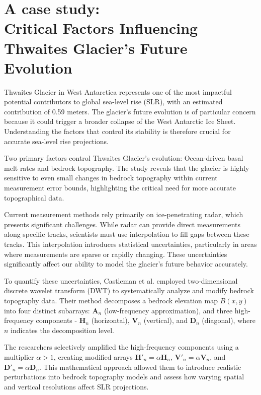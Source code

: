 \section*{A case study:\\Critical Factors Influencing Thwaites Glacier's Future Evolution} %

Thwaites Glacier in West Antarctica represents one of the most impactful potential contributors to global sea-level rise (SLR), with an estimated contribution of 0.59 meters. The glacier's future evolution is of particular concern because it could trigger a broader collapse of the West Antarctic Ice Sheet. Understanding the factors that control its stability is therefore crucial for accurate sea-level rise projections.

Two primary factors control Thwaites Glacier's evolution\cite{Castleman_2022}: Ocean-driven basal melt rates and bedrock topography. The study reveals that the glacier is highly sensitive to even small changes in bedrock topography within current measurement error bounds, highlighting the critical need for more accurate topographical data.

Current measurement methods rely primarily on ice-penetrating radar, which presents significant challenges. While radar can provide direct measurements along specific tracks, scientists must use interpolation to fill gaps between these tracks. This interpolation introduces statistical uncertainties, particularly in areas where measurements are sparse or rapidly changing. These uncertainties significantly affect our ability to model the glacier's future behavior accurately.

To quantify these uncertainties, Castleman et al.\cite{Castleman_2022} employed two-dimensional discrete wavelet transform (DWT) to systematically analyze and modify bedrock topography data. Their method decomposes a bedrock elevation map $B(x,y)$ into four distinct subarrays: $\mathbf{A}_n$ (low-frequency approximation), and three high-frequency components - $\mathbf{H}_n$ (horizontal), $\mathbf{V}_n$ (vertical), and $\mathbf{D}_n$ (diagonal), where $n$ indicates the decomposition level. 

The researchers selectively amplified the high-frequency components using a multiplier $\alpha > 1$, creating modified arrays $\mathbf{H}'_n = \alpha\mathbf{H}_n$, $\mathbf{V}'_n = \alpha\mathbf{V}_n$, and $\mathbf{D}'_n = \alpha\mathbf{D}_n$. This mathematical approach allowed them to introduce realistic perturbations into bedrock topography models and assess how varying spatial and vertical resolutions affect SLR projections.

